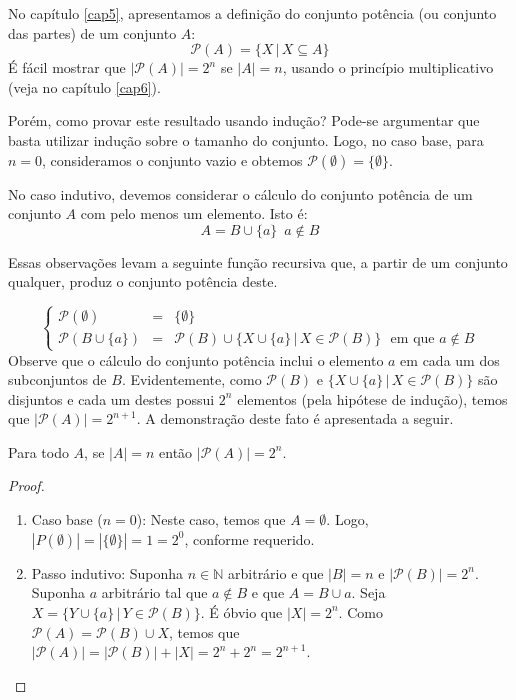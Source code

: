 No capítulo \ref{cap5}, apresentamos a definição do conjunto potência
(ou conjunto das partes) de um conjunto $A$:
\[\mathcal{P}(A) =\{X\,|\,X\subseteq A\}\]
É fácil mostrar que $|\mathcal{P}(A)| = 2^n$ se $|A| = n$, usando o
princípio multiplicativo (veja no capítulo \ref{cap6}).

Porém, como provar este resultado usando indução? Pode-se argumentar que basta
utilizar indução sobre o tamanho do conjunto. Logo, no caso base, para
$n = 0$, consideramos o conjunto vazio e obtemos $\mathcal{P}(\emptyset)=\{\emptyset\}$.

No caso indutivo, devemos considerar o cálculo do conjunto potência de
um conjunto $A$ com pelo menos um elemento. Isto é:
\[
A = B \cup \{a\}\,\,\,a\not\in B
\]

Essas observações levam a seguinte função recursiva que, a partir de
um conjunto qualquer, produz o conjunto potência deste.

\[
\left\{
\begin{array}{lcl}
\mathcal{P}(\emptyset) & = & \{\emptyset\}\\
\mathcal{P}(B \cup \{a\}) & = & \mathcal{P}(B)\cup \{X \cup
\{a\}\,|\,X \in \mathcal{P}(B)\}\,\,\,\,\text{em que }a\not\in B
\end{array}
\right.
\]
Observe que o cálculo do conjunto potência inclui o elemento $a$ em
cada um dos subconjuntos de $B$. Evidentemente, como $\mathcal{P}(B)$
e $\{X \cup\{a\}\,|\,X \in \mathcal{P}(B)\}$ são disjuntos e cada um
destes possui $2^n$ elementos (pela hipótese de indução), temos que
$|\mathcal{P}(A)| = 2^{n + 1}$. A demonstração deste fato é
apresentada a seguir.

\begin{Theorem}
Para todo $A$, se $|A| = n$ então $|\mathcal{P}(A)|=2^{n}$.
\end{Theorem}
\begin{proof}
\verb| |\\
\begin{enumerate}
  \item[\ ]Caso base ($n = 0$): Neste caso, temos que $A =
    \emptyset$. Logo, $|P(\emptyset)| = |\{\emptyset\}| = 1 = 2^0$,
    conforme requerido.
  \item[\ ]Passo indutivo: Suponha $n \in\mathbb{N}$ arbitrário e que
    $|B| = n$ e $|\mathcal{P}(B)| = 2^n$. Suponha $a$ arbitrário tal
    que $a\not\in B$ e que $A = B \cup {a}$. Seja $X = \{Y \cup
    \{a\}\,|\,Y \in \mathcal{P}(B)\}$. É óbvio que $|X| = 2^n$. Como
    $\mathcal{P}(A) = \mathcal{P}(B) \cup X$, temos que
    $|\mathcal{P}(A)| = |\mathcal{P}(B)| + |X| = 2^n + 2^n = 2^{n + 1}$.
\end{enumerate}
\end{proof}


